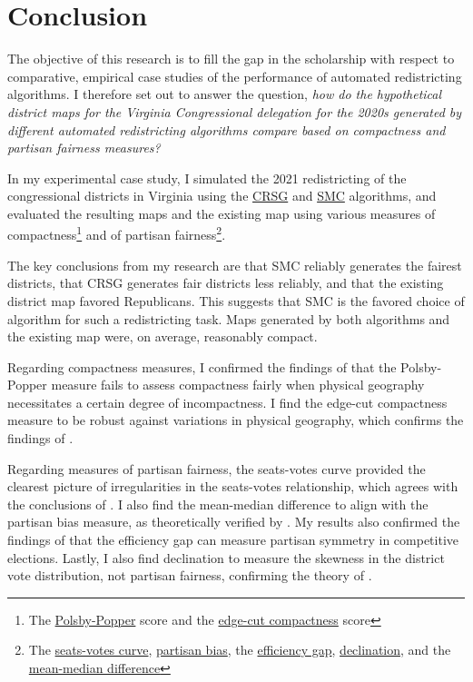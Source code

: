 \section{Conclusion}
\label{sec:conc}

The objective of this research is to fill the gap in the scholarship with respect to comparative, empirical case studies of the performance of automated redistricting algorithms. I therefore set out to answer the question, \emph{how do the hypothetical district maps for the Virginia Congressional delegation for the 2020s generated by different automated redistricting algorithms compare based on compactness and partisan fairness measures?}

In my experimental case study, I simulated the 2021 redistricting of the congressional districts in Virginia using the \hyperref[sec:crsg]{CRSG} and \hyperref[sec:smc]{SMC} algorithms, and evaluated the resulting maps and the existing map using various measures of compactness\footnote{The \hyperref[sec:polsbypopper]{Polsby-Popper} score and the \hyperref[sec:edgecut]{edge-cut compactness} score} and of partisan fairness\footnote{The \hyperref[sec:seatsvotes]{seats-votes curve}, \hyperref[sec:bias]{partisan bias}, the \hyperref[sec:effgap]{efficiency gap}, \hyperref[sec:declination]{declination}, and the \hyperref[sec:meanmed]{mean-median difference}}. 

The key conclusions from my research are that SMC reliably generates the fairest districts, that CRSG generates fair districts less reliably, and that the existing district map favored Republicans. This suggests that SMC is the favored choice of algorithm for such a redistricting task. Maps generated by both algorithms and the existing map were, on average, reasonably compact.

Regarding compactness measures, I confirmed the findings of \textcite{mccartan2020} that the Polsby-Popper measure fails to assess compactness fairly when physical geography necessitates a certain degree of incompactness. I find the edge-cut compactness measure to be robust against variations in physical geography, which confirms the findings of \textcite{dube2016}.

Regarding measures of partisan fairness, the seats-votes curve provided the clearest picture of irregularities in the seats-votes relationship, which agrees with the conclusions of \textcite{katz2020}. I also find the mean-median difference to align with the partisan bias measure, as theoretically verified by \textcite{katz2020}. My results also confirmed the findings of \textcite{veomett2018} that the efficiency gap can measure partisan symmetry in competitive elections. Lastly, I also find declination to measure the skewness in the district vote distribution, not partisan fairness, confirming the theory of \textcite{katz2020}. 

